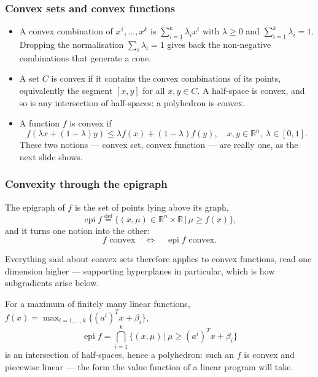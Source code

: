 \documentclass[aspectratio=169]{beamer}
\providecommand{\red}{\color{red}}
\def\RR{\mathbb{R}}
\begin{document}
\begin{frame}
\frametitle{Convex sets and convex functions}

\begin{itemize}
	\item
	A {\red convex combination} of $x^1, \ldots, x^k$ is $\sum_{i=1}^k \lambda_i x^i$ with $\lambda \geq 0$ and $\sum_{i=1}^k \lambda_i = 1$.
	Dropping the normalisation $\sum_i \lambda_i = 1$ gives back the non-negative combinations that generate a cone.
	\item
	A set $C$ is {\red convex} if it contains the convex combinations of its points, equivalently the segment $[x,y]$ for all $x, y \in C$.
	A half-space is convex, and so is any intersection of half-spaces: {\red a polyhedron is convex}.
	\item
	A function $f$ is {\red convex} if
	\[
	f(\lambda x + (1-\lambda)y) \leq \lambda f(x) + (1-\lambda) f(y), \quad x, y \in \RR^n,\ \lambda \in [0,1].
	\]
	These two notions --- convex set, convex function --- are really one, as the next slide shows.
\end{itemize}

\end{frame}

\begin{frame}
\frametitle{Convexity through the epigraph}
\small

The {\red epigraph} of $f$ is the set of points lying above its graph,
\[
\operatorname{epi} f \overset{\mathrm{def}}{=} \lbrace (x,\mu) \in \RR^n \times \RR \,|\, \mu \geq f(x) \rbrace,
\]
and it turns one notion into the other:
\[
f \text{ convex} \quad \iff \quad \operatorname{epi} f \text{ convex}.
\]

\vspace{-2mm}

Everything said about convex {\red sets} therefore applies to convex {\red functions}, read one dimension higher --- supporting hyperplanes in particular, which is how subgradients arise below.

For a maximum of finitely many linear functions, $f(x) = \max_{i=1,\ldots,k} \lbrace (a^i)^Tx + \beta_i \rbrace$,
\[
\operatorname{epi} f = \bigcap_{i=1}^k \lbrace (x,\mu) \,|\, \mu \geq (a^i)^Tx + \beta_i \rbrace
\]
is an intersection of half-spaces, hence a polyhedron: {\red such an $f$ is convex and piecewise linear} --- the form the value function of a linear program will take.

\end{frame}
\end{document}
